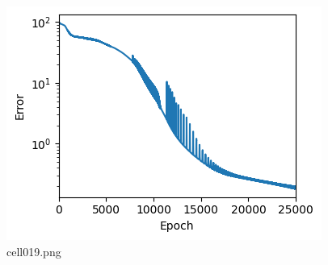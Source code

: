 \begin{figure}[ht]
	\centering
	\includegraphics[scale=0.8, max width=\linewidth]{./fig/solve-credit-assignment-problem/bptt/cell019.png}
	\caption{cell019.png}
	\label{cell019.png}
\end{figure}